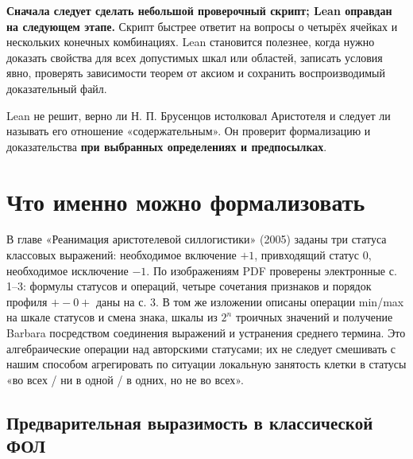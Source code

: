 \documentclass[12pt,a4paper]{article}
\begin{document}
\textbf{Сначала следует сделать небольшой проверочный скрипт; Lean оправдан на следующем этапе.} Скрипт быстрее ответит на вопросы о четырёх ячейках и нескольких конечных комбинациях. Lean становится полезнее, когда нужно доказать свойства для всех допустимых шкал или областей, записать условия явно, проверять зависимости теорем от аксиом и сохранить воспроизводимый доказательный файл.

Lean не решит, верно ли Н. П. Брусенцов истолковал Аристотеля и следует ли называть его отношение «содержательным». Он проверит формализацию и доказательства \textbf{при выбранных определениях и предпосылках}.

\section{Что именно можно формализовать}

В главе «Реанимация аристотелевой силлогистики» (2005) заданы три статуса классовых выражений: необходимое включение \(+1\), привходящий статус \(0\), необходимое исключение \(-1\). По изображениям PDF проверены электронные с. 1–3: формулы статусов и операций, четыре сочетания признаков и порядок профиля \(+-0+\) даны на с. 3. В том же изложении описаны операции min/max на шкале статусов и смена знака, шкалы из \(2^n\) троичных значений и получение Barbara посредством соединения выражений и устранения среднего термина. Это алгебраические операции над авторскими статусами; их не следует смешивать с нашим способом агрегировать по ситуации локальную занятость клетки в статусы «во всех / ни в одной / в одних, но не во всех».

\subsection*{Предварительная выразимость в классической ФОЛ}
\end{document}
